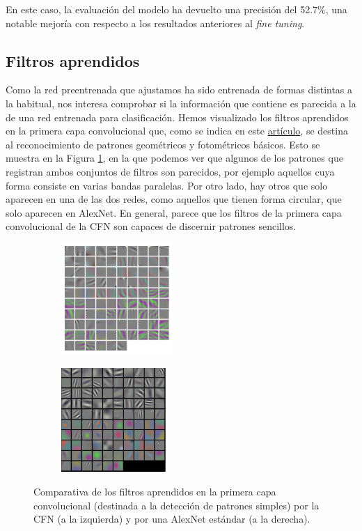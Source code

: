 \documentclass[10pt,a4paper]{article}
\begin{document}
En este caso, la evaluación del modelo ha devuelto una precisión del 52.7\%, una notable mejoría con respecto a los resultados anteriores al \textit{fine tuning}.





\subsection{Filtros aprendidos}

Como la red preentrenada que ajustamos ha sido entrenada de formas distintas a la habitual, nos interesa comprobar si la información que contiene es parecida a la de una red entrenada para clasificación. Hemos visualizado los filtros aprendidos en la primera capa convolucional que, como se indica en este \href{https://arxiv.org/abs/1411.1792}{artículo}, se destina al reconocimiento de patrones geométricos y fotométricos básicos. Esto se muestra en la Figura \ref{fig:filtros_cfn_vs_alexnet}, en la que podemos ver que algunos de los patrones que registran ambos conjuntos de filtros son parecidos, por ejemplo aquellos cuya forma consiste en varias bandas paralelas. Por otro lado, hay otros que solo aparecen en una de las dos redes, como aquellos que tienen forma circular, que solo aparecen en AlexNet. En general, parece que los filtros de la primera capa convolucional de la CFN son capaces de discernir patrones sencillos.

\begin{figure}[h]
	\begin{subfigure}{0.5\textwidth}
		\centering
		\includegraphics[height=160px,width=160px]{filtros_conv1_sc}
	\end{subfigure}
	\begin{subfigure}{0.5\textwidth}
		\centering
		\includegraphics[height=150px,width=150px]{filtros_conv1_alexnet}
	\end{subfigure}
	\caption{Comparativa de los filtros aprendidos en la primera capa convolucional (destinada a la detección de patrones simples) por la CFN (a la izquierda) y por una AlexNet estándar (a la derecha).}
	\label{fig:filtros_cfn_vs_alexnet}
\end{figure}
\end{document}
